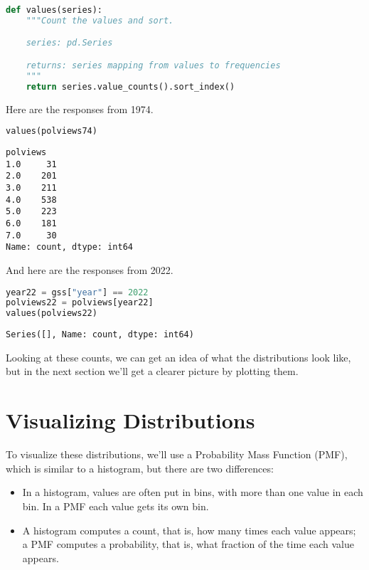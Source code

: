 \begin{lstlisting}[language=Python,style=source]
def values(series):
    """Count the values and sort.

    series: pd.Series

    returns: series mapping from values to frequencies
    """
    return series.value_counts().sort_index()
\end{lstlisting}

Here are the responses from 1974.

\begin{lstlisting}[language=Python,style=source]
values(polviews74)
\end{lstlisting}

\begin{lstlisting}[style=output]
polviews
1.0     31
2.0    201
3.0    211
4.0    538
5.0    223
6.0    181
7.0     30
Name: count, dtype: int64
\end{lstlisting}

And here are the responses from 2022.

\begin{lstlisting}[language=Python,style=source]
year22 = gss["year"] == 2022
polviews22 = polviews[year22]
values(polviews22)
\end{lstlisting}

\begin{lstlisting}[style=output]
Series([], Name: count, dtype: int64)
\end{lstlisting}

Looking at these counts, we can get an idea of what the distributions
look like, but in the next section we'll get a clearer picture by
plotting them.

\hypertarget{visualizing-distributions}{%
\section{Visualizing Distributions}\label{visualizing-distributions}}

To visualize these distributions, we'll use a Probability Mass Function
(PMF), which is similar to a histogram, but there are two differences:

\begin{itemize}
\item
  In a histogram, values are often put in bins, with more than one value
  in each bin. In a PMF each value gets its own bin.
\item
  A histogram computes a count, that is, how many times each value
  appears; a PMF computes a probability, that is, what fraction of the
  time each value appears.
\end{itemize}

